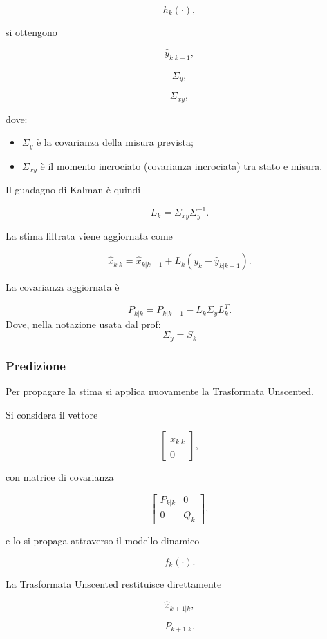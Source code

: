 \documentclass[11pt,a4paper]{article}
\begin{document}
\[
h_k(\cdot),
\]

si ottengono

\[
\boxed{
\hat{y}_{k|k-1},
}
\]

\[
\boxed{
\Sigma_y,
}
\]

\[
\boxed{
\Sigma_{xy},
}
\]

dove:

\begin{itemize}
    \item \(\Sigma_y\) è la covarianza della misura prevista;
    \item \(\Sigma_{xy}\) è il momento incrociato (covarianza incrociata) tra stato e misura.
\end{itemize}

Il guadagno di Kalman è quindi

\[
\boxed{
L_k
=
\Sigma_{xy}\Sigma_y^{-1}.
}
\]

La stima filtrata viene aggiornata come

\[
\boxed{
\hat{x}_{k|k}
=
\hat{x}_{k|k-1}
+
L_k
\left(
y_k-\hat{y}_{k|k-1}
\right).
}
\]

La covarianza aggiornata è

\[
\boxed{
P_{k|k}
=
P_{k|k-1}
-
L_k\Sigma_yL_k^T.
}
\]
Dove, nella notazione usata dal prof:
\[
\Sigma_y = S_k
\]

\subsubsection*{Predizione}

Per propagare la stima si applica nuovamente la Trasformata Unscented.

Si considera il vettore

\[
\begin{bmatrix}
\hat{x}_{k|k}\\
0
\end{bmatrix},
\]

con matrice di covarianza

\[
\begin{bmatrix}
P_{k|k} & 0\\
0 & Q_k
\end{bmatrix},
\]

e lo si propaga attraverso il modello dinamico

\[
f_k(\cdot).
\]

La Trasformata Unscented restituisce direttamente

\[
\boxed{
\hat{x}_{k+1|k},
}
\]

\[
\boxed{
P_{k+1|k}.
}
\]
\end{document}
